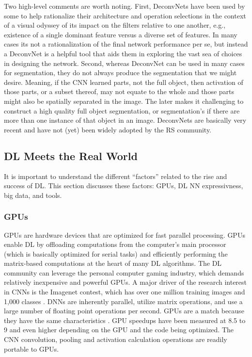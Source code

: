 \documentclass[12pt]{spieman}
\begin{document}
\begin{spacing}{1}
Two high-level comments are worth noting. First, DeconvNets have been used by some to help rationalize their architecture and operation selections in the context of a visual odyssey of its impact on the filters relative to one another, e.g., existence of a single dominant feature versus a diverse set of features. In many cases its not a rationalization of the final network performance per se, but instead a DeconvNet is a helpful tool that aids them in exploring the vast sea of choices in designing the network. Second, whereas DeconvNet can be used in many cases for segmentation, they do not always produce the segmentation that we might desire. Meaning, if the CNN learned parts, not the full object, then activation of those parts, or a subset thereof, may not equate to the whole and those parts might also be spatially separated in the image. The later makes it challenging to construct a high quality full object segmentation, or segmentation's if there are more than one instance of that object in an image. DeconvNets are basically very recent and have not (yet) been widely adopted by the RS community.

\subsection{DL Meets the Real World}
It is important to understand the different ``factors'' related to the rise and success of DL. This section discusses these factors: GPUs, DL NN expressivness, big data, and tools.

\subsubsection{GPUs}
GPUs are hardware devices that are optimized for fast parallel processing. GPUs enable DL by offloading computations from the computer's main processor (which is basically optimized for serial tasks) and efficiently performing the matrix-based computations at the heart of many DL algorithms.  The DL community can leverage the personal computer gaming industry, which demands relatively inexpensive and powerful GPUs. A major driver of the research interest in CNNs is the Imagenet contest, which has over one million training images and 1,000 classes  \cite{russakovsky2015imagenet} . DNNs are inherently parallel, utilize matrix operations, and use a large number of floating point operations per second. GPUs are a match because they have the same characteristics \cite{Brown2015Deep} . GPU speedups have been measured at 8.5 to 9 \cite{Brown2015Deep} and even higher depending on the GPU and the code being optimized. The CNN convolution, pooling and activation calculation operations are readily portable to GPUs.


\end{spacing}
\end{document}
